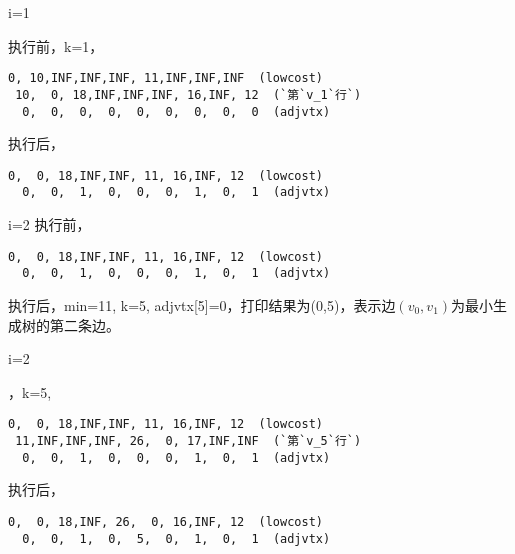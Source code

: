 \begin{frame}[fragile]\ft{\subsubsecname}

\begin{figure}
\centering

\end{figure}
\end{frame}

 

\begin{frame}[fragile]\ft{\subsubsecname}
\tf i=1 
 

执行前，k=1，
\begin{lstlisting}[xleftmargin=2em]
  0, 10,INF,INF,INF, 11,INF,INF,INF  (lowcost)
 10,  0, 18,INF,INF,INF, 16,INF, 12  (`第`v_1`行`)
  0,  0,  0,  0,  0,  0,  0,  0,  0  (adjvtx)
\end{lstlisting} %
执行后，
\begin{lstlisting}[xleftmargin=2em]
  0,  0, 18,INF,INF, 11, 16,INF, 12  (lowcost)
  0,  0,  1,  0,  0,  0,  1,  0,  1  (adjvtx)
\end{lstlisting}
\end{frame}

\begin{frame}[fragile]\ft{\subsubsecname}
\tf i=2  
执行前，
\begin{lstlisting}[xleftmargin=2em]
  0,  0, 18,INF,INF, 11, 16,INF, 12  (lowcost)
  0,  0,  1,  0,  0,  0,  1,  0,  1  (adjvtx)
\end{lstlisting}
执行后，min=11, k=5, adjvtx[5]=0，打印结果为(0,5)，表示边$(v_0,v_1)$为最小生成树的第二条边。
\end{frame}

\begin{frame}\ft{\subsubsecname}
\begin{figure}
\centering

\end{figure}
\end{frame}

\begin{frame}[fragile]\ft{\subsubsecname}
\tf i=2

，k=5,  
\begin{lstlisting}[xleftmargin=2em]
  0,  0, 18,INF,INF, 11, 16,INF, 12  (lowcost)
 11,INF,INF,INF, 26,  0, 17,INF,INF  (`第`v_5`行`)
  0,  0,  1,  0,  0,  0,  1,  0,  1  (adjvtx)
\end{lstlisting}  
执行后，
\begin{lstlisting}[xleftmargin=2em]
  0,  0, 18,INF, 26,  0, 16,INF, 12  (lowcost)
  0,  0,  1,  0,  5,  0,  1,  0,  1  (adjvtx)
\end{lstlisting}
\end{frame}


